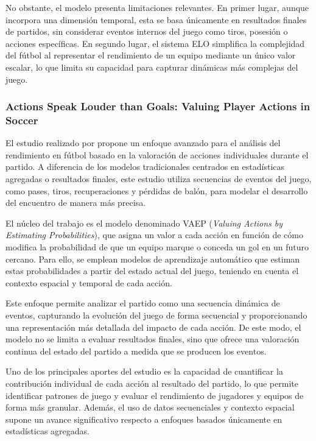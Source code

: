 No obstante, el modelo presenta limitaciones relevantes. En primer lugar, aunque incorpora una dimensión temporal, esta se basa únicamente en resultados finales de partidos, sin considerar eventos internos del juego como tiros, posesión o acciones específicas. En segundo lugar, el sistema ELO simplifica la complejidad del fútbol al representar el rendimiento de un equipo mediante un único valor escalar, lo que limita su capacidad para capturar dinámicas más complejas del juego.

\subsubsection{Actions Speak Louder than Goals: Valuing Player Actions in Soccer}

El estudio realizado por \cite{decroos2019actions} propone un enfoque avanzado para el análisis del rendimiento en fútbol basado en la valoración de acciones individuales durante el partido. A diferencia de los modelos tradicionales centrados en estadísticas agregadas o resultados finales, este estudio utiliza secuencias de eventos del juego, como pases, tiros, recuperaciones y pérdidas de balón, para modelar el desarrollo del encuentro de manera más precisa.

El núcleo del trabajo es el modelo denominado VAEP (\textit{Valuing Actions by Estimating Probabilities}), que asigna un valor a cada acción en función de cómo modifica la probabilidad de que un equipo marque o conceda un gol en un futuro cercano. Para ello, se emplean modelos de aprendizaje automático que estiman estas probabilidades a partir del estado actual del juego, teniendo en cuenta el contexto espacial y temporal de cada acción.

Este enfoque permite analizar el partido como una secuencia dinámica de eventos, capturando la evolución del juego de forma secuencial y proporcionando una representación más detallada del impacto de cada acción. De este modo, el modelo no se limita a evaluar resultados finales, sino que ofrece una valoración continua del estado del partido a medida que se producen los eventos.

Uno de los principales aportes del estudio es la capacidad de cuantificar la contribución individual de cada acción al resultado del partido, lo que permite identificar patrones de juego y evaluar el rendimiento de jugadores y equipos de forma más granular. Además, el uso de datos secuenciales y contexto espacial supone un avance significativo respecto a enfoques basados únicamente en estadísticas agregadas.

